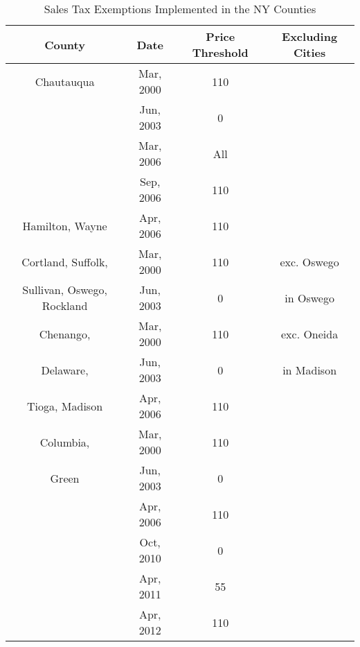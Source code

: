 \documentclass[12pt]{article}
\begin{document}
\begin{table}
	\caption{Sales Tax Exemptions Implemented in the NY Counties}
	\label{table:couexe}
	\centering
\begin{tabular}{|c|c|c|c|}
	\hline 
	County	& Date   & Price Threshold & Excluding Cities   \\ 
	\hline 
	Chautauqua	& Mar, 2000  &  110   &  \\ 
				& Jun, 2003  & 0     & \\ 
				& Mar, 2006  & All    &   \\  
				& Sep, 2006  & 110    &  \\ \hline 
	Hamilton, Wayne 	& Apr, 2006   & 110   & \\ \hline 
	Cortland, Suffolk, 	& Mar, 2000  &  110   &  exc. Oswego \\ 
	 Sullivan, Oswego, Rockland			& Jun, 2003  & 0     & in Oswego \\ \hline 
	Chenango, 	& Mar, 2000  &  110  &   exc. Oneida\\ 
	Delaware,	& Jun, 2003  & 0     & in Madison\\ 
	Tioga, Madison		& Apr, 2006  & 110   &    \\ \hline 
	Columbia, 	& Mar, 2000  &  110  &   \\ 
	Green		& Jun, 2003  & 0     & \\ 
				& Apr, 2006  & 110   &    \\ 
				& Oct, 2010  & 0  & \\ 
				& Apr, 2011  & 55  & \\ 
				& Apr, 2012  & 110  & \\ \hline 

\end{tabular}
\end{table}
\end{document}

